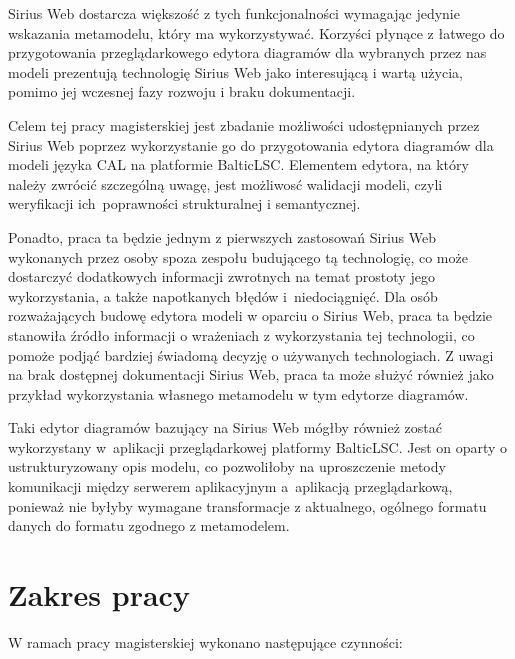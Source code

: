 Sirius Web dostarcza większość z tych
funkcjonalności wymagając jedynie wskazania metamodelu, który ma wykorzystywać.
Korzyści płynące z łatwego do przygotowania przeglądarkowego edytora diagramów
dla wybranych przez
nas modeli prezentują technologię Sirius Web jako interesującą i wartą użycia,
pomimo jej wczesnej fazy rozwoju i braku dokumentacji.

Celem tej pracy magisterskiej jest zbadanie możliwości udostępnianych przez
Sirius Web poprzez wykorzystanie go do przygotowania edytora
diagramów dla modeli języka CAL na platformie BalticLSC\@. Elementem edytora,
na który należy zwrócić szczególną uwagę, jest możliwosć walidacji modeli,
czyli weryfikacji ich~poprawności strukturalnej i semantycznej.

Ponadto, praca ta będzie jednym z pierwszych zastosowań Sirius Web wykonanych
przez osoby spoza zespołu budującego tą technologię, co może dostarczyć
dodatkowych informacji zwrotnych na temat prostoty jego wykorzystania, a także
napotkanych błędów i~niedociągnięć. Dla osób rozważających budowę edytora
modeli w oparciu o Sirius Web, praca ta będzie stanowiła źródło informacji o
wrażeniach z wykorzystania tej technologii, co pomoże podjąć bardziej świadomą
decyzję o używanych technologiach.
Z uwagi na brak dostępnej dokumentacji Sirius Web, praca ta może służyć również
jako przykład wykorzystania własnego metamodelu w tym edytorze diagramów.

Taki edytor diagramów bazujący na Sirius Web mógłby również zostać wykorzystany
w~aplikacji przeglądarkowej platformy BalticLSC\@. Jest on oparty o
ustrukturyzowany opis modelu, co pozwoliłoby na uproszczenie metody komunikacji
między serwerem aplikacyjnym a~aplikacją przeglądarkową, ponieważ nie byłyby
wymagane transformacje z aktualnego, ogólnego formatu danych do formatu
zgodnego z metamodelem.

\section{Zakres pracy}

W ramach pracy magisterskiej wykonano następujące czynności:


